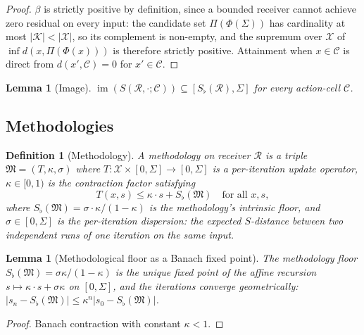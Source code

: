 \documentclass[11pt,a4paper]{article}
\newtheorem{lemma}[theorem]{Lemma}
\newtheorem{definition}[theorem]{Definition}
\DeclareMathOperator{\img}{im}
\newcommand{\Cands}{\mathcal{X}}
\newcommand{\Knowl}{\mathcal{K}}
\newcommand{\Cell}{\mathcal{C}}
\newcommand{\Method}{\mathfrak{M}}
\newcommand{\receiver}{\mathcal{R}}
\newcommand{\Sigmax}{\Sigma}
\newcommand{\Sscalar}{S}
\newcommand{\Sfloor}{S_{\flat}}
\newcommand{\catpow}{\kappa}
\newcommand{\disp}{\sigma}
\begin{document}
\begin{proof}
$\beta$ is strictly positive by definition, since a bounded receiver cannot achieve zero residual on every input: the candidate set $\Pi(\Phi(\Sigma))$ has cardinality at most $|\Knowl| < |\Cands|$, so its complement is non-empty, and the supremum over $\Cands$ of $\inf d(x, \Pi(\Phi(x)))$ is therefore strictly positive. Attainment when $x \in \Cell$ is direct from $d(x', \Cell) = 0$ for $x' \in \Cell$.
\end{proof}

\begin{lemma}[Image]
\label{lem:image}
$\img(\Sscalar(\receiver, \cdot; \Cell)) \subseteq [\Sfloor(\receiver), \Sigmax]$ for every action-cell $\Cell$.
\end{lemma}

\subsection{Methodologies}

\begin{definition}[Methodology]
\label{def:method}
A \emph{methodology} on receiver $\receiver$ is a triple $\Method = (T, \catpow, \disp)$ where $T : \Cands \times [0, \Sigmax] \to [0, \Sigmax]$ is a per-iteration update operator, $\catpow \in [0, 1)$ is the \emph{contraction factor} satisfying
\[
T(x, s) \leq \catpow \cdot s + \Sfloor(\Method) \quad \text{for all } x, s,
\]
where $\Sfloor(\Method) = \disp \cdot \catpow / (1 - \catpow)$ is the methodology's intrinsic floor, and $\disp \in [0, \Sigmax]$ is the per-iteration dispersion: the expected $S$-distance between two independent runs of one iteration on the same input.
\end{definition}

\begin{lemma}[Methodological floor as a Banach fixed point]
\label{lem:methodfloor}
The methodology floor $\Sfloor(\Method) = \disp \catpow / (1 - \catpow)$ is the unique fixed point of the affine recursion $s \mapsto \catpow \cdot s + \disp \catpow$ on $[0, \Sigmax]$, and the iterations converge geometrically: $\lvert s_n - \Sfloor(\Method) \rvert \leq \catpow^n \lvert s_0 - \Sfloor(\Method) \rvert$.
\end{lemma}

\begin{proof}
Banach contraction with constant $\catpow < 1$.
\end{proof}


\end{document}
